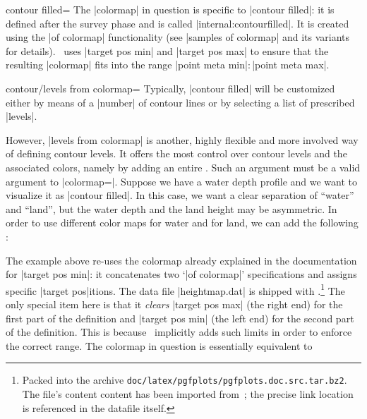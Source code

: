 {{\begin{plottype}[/pgfplots]{contour filled=\textcolor{black}{}}
	The |colormap| in question is specific to |contour filled|: it is defined after the survey phase and is called |internal:contourfilled|. It is created using the |of colormap| functionality (see |samples of colormap| and its variants for details). \PGFPlots\ uses |target pos min| and |target pos max| to ensure that the resulting |colormap| fits into the range |point meta min|$:$|point meta max|.

	\begin{pgfplotskey}{contour/levels from colormap=}
	Typically, |contour filled| will be customized either by means of a |number|
	of contour lines or by selecting a list of prescribed |levels|.

	However, |levels from colormap| is another, highly flexible and more involved way of defining contour levels. It offers the most control over contour levels and the associated colors, namely by adding an entire . Such an argument must be a valid argument to |colormap=|. Suppose we have a water depth profile and we want to visualize it as |contour filled|. In this case, we want a clear separation of ``water'' and ``land'', but the water depth and the land height may be asymmetric. In order to use different color maps for water and for land, we can add the following :
\pgfplotsexpensiveexample
\begin{codeexample}[]
\end{codeexample}
	The example above re-uses the colormap already explained in the documentation for |target pos min|: it concatenates two `|of colormap|' specifications and assigns specific |target pos|itions. The data file |heightmap.dat| is shipped with \PGFPlots.\footnote{Packed into the archive \texttt{doc/latex/pgfplots/pgfplots.doc.src.tar.bz2}. The file's content content has been imported from~\cite{LiveAccessServer}; the precise link location is referenced in the datafile itself.}
	The only special item here is that it \emph{clears} |target pos max| (the right end) for the first part of the definition and |target pos min| (the left end) for the second part of the definition. This is because \PGFPlots\ implicitly adds such limits in order to enforce the correct range. The colormap in question is essentially equivalent to


\end{pgfplotskey}
\end{plottype}}}
